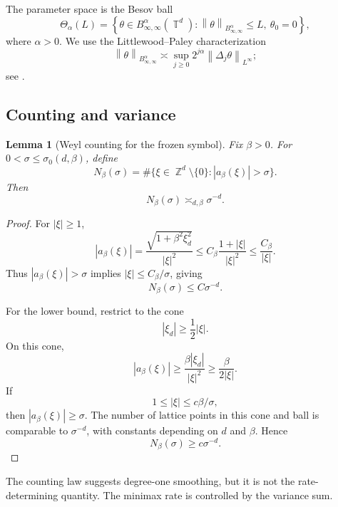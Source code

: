 \documentclass[12pt]{article}
\newtheorem{lemma}[theorem]{Lemma}
\theoremstyle{remark}
\DeclareMathOperator{\Z}{\mathbb Z}
\DeclareMathOperator{\T}{\mathbb T}
\newcommand{\norm}[1]{\left\lVert #1\right\rVert}
\newcommand{\asym}{\asymp}
\begin{document}
The parameter space is the Besov ball
\[
\Theta_\alpha(L)
=
\left\{
\theta\in B^\alpha_{\infty,\infty}(\T^d):
\norm{\theta}_{B^\alpha_{\infty,\infty}}\le L,
\ \theta_0=0
\right\},
\]
where \(\alpha>0\). We use the Littlewood--Paley characterization
\[
\norm{\theta}_{B^\alpha_{\infty,\infty}}
\asym
\sup_{j\ge0}2^{j\alpha}\norm{\Delta_j\theta}_{L^\infty};
\]
see \cite{Triebel}.

\subsection{Counting and variance}

\begin{lemma}[Weyl counting for the frozen symbol]
\label{lem:frozen-counting}
Fix \(\beta>0\). For \(0<\sigma\le\sigma_0(d,\beta)\), define
\[
N_\beta(\sigma)
=
\#\{\xi\in\Z^d\setminus\{0\}: |a_\beta(\xi)|>\sigma\}.
\]
Then
\[
N_\beta(\sigma)\asym_{d,\beta}\sigma^{-d}.
\]
\end{lemma}
\begin{proof}
For \(|\xi|\ge1\),
\[
|a_\beta(\xi)|
=
\frac{\sqrt{1+\beta^2\xi_d^2}}{|\xi|^2}
\le
C_\beta\frac{1+|\xi|}{|\xi|^2}
\le
\frac{C_\beta}{|\xi|}.
\]
Thus \(|a_\beta(\xi)|>\sigma\) implies \(|\xi|\le C_\beta/\sigma\), giving
\[
N_\beta(\sigma)\le C\sigma^{-d}.
\]

For the lower bound, restrict to the cone
\[
|\xi_d|\ge \frac12|\xi|.
\]
On this cone,
\[
|a_\beta(\xi)|
\ge
\frac{\beta|\xi_d|}{|\xi|^2}
\ge
\frac{\beta}{2|\xi|}.
\]
If
\[
1\le |\xi|\le c\beta/\sigma,
\]
then \(|a_\beta(\xi)|\ge\sigma\). The number of lattice points in this cone and ball is comparable to \(\sigma^{-d}\), with constants depending on \(d\) and \(\beta\). Hence
\[
N_\beta(\sigma)\ge c\sigma^{-d}.
\]
\end{proof}

The counting law suggests degree-one smoothing, but it is not the rate-determining quantity. The minimax rate is controlled by the variance sum.
\end{document}
